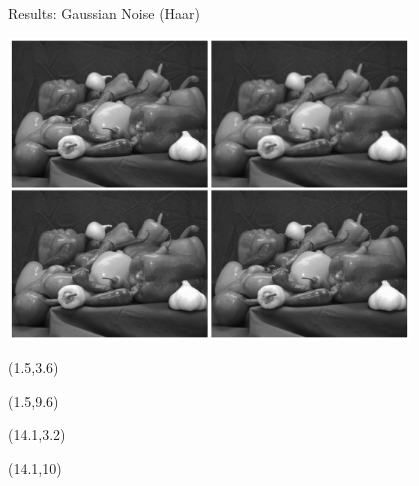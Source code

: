 \documentclass[12pt]{beamer}
\begin{document}
\begin{frame}{Results: Gaussian Noise (Haar)}
\begin{center}
\vspace{-3 mm}
\includegraphics[width = 0.8\textwidth]{../figures/waveletGaussH.pdf} 
\end{center}

\begin{textblock}{5}(1.5,3.6)
\end{textblock}

\begin{textblock}{5}(1.5,9.6)
\end{textblock}

\begin{textblock}{5}(14.1,3.2)
\end{textblock}

\begin{textblock}{5}(14.1,10)
\end{textblock}
\end{frame}
\end{document}
